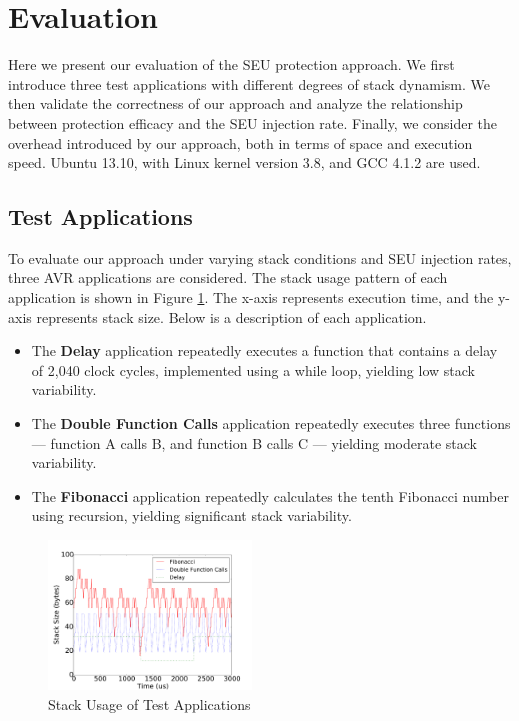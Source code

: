 \section{Evaluation}\label{sec:evaluation}

Here we present our evaluation of the SEU protection approach. We first introduce three test applications with different degrees of stack dynamism. We then validate the correctness of our approach and analyze the relationship between protection efficacy and the SEU injection rate. Finally, we consider the overhead introduced by our approach, both in terms of space and execution speed. Ubuntu 13.10, with Linux kernel version 3.8, and GCC 4.1.2 are used.

\subsection{Test Applications}

To evaluate our approach under varying stack conditions and SEU injection rates, three AVR applications are considered. The stack usage pattern of each application is shown in Figure \ref{fig:stacksize_usage}. The x-axis represents execution time, and the y-axis represents stack size. Below is a description of each application.

\begin{itemize}
\item The \textbf{Delay} application repeatedly executes a function that contains a delay of 2,040 clock cycles, implemented using a while loop, yielding low stack variability.
\item The \textbf{Double Function Calls} application repeatedly executes three functions --- function A calls B, and function B calls C --- yielding moderate stack variability.
\item The \textbf{Fibonacci} application repeatedly calculates the tenth Fibonacci number using recursion, yielding significant stack variability.
\end{itemize}

\begin{figure}[h]
\centering
\includegraphics[width=0.48\textwidth]{figures/stacksize_usage_v3.pdf}
\vspace{5pt}
\caption{Stack Usage of Test Applications}
\label{fig:stacksize_usage}
\end{figure}

